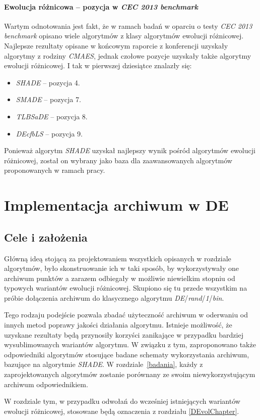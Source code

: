 \documentclass[12pt,a4paper]{report}
\begin{document}
{{{{{{\subsubsection{Ewolucja różnicowa -- pozycja w \emph{CEC 2013 benchmark}}
\par{
Wartym odnotowania jest fakt, że w ramach badań w oparciu o testy \emph{CEC 2013 benchmark} opisano wiele algorytmów z klasy algorytmów ewolucji różnicowej. Najlepsze rezultaty opisane w końcowym raporcie z konferencji \cite{CEC2013Comp} uzyskały algorytmy z rodziny \emph{CMAES}, jednak czołowe pozycje uzyskały także algorytmy ewolucji różnicowej. I tak w pierwszej dziesiątce znalazły się:
\begin{itemize}
\item \emph{SHADE} \cite{SHADE} -- pozycja 4.
\item \emph{SMADE} \cite{SMADE} -- pozycja 7.
\item \emph{TLBSaDE} \cite{TLBSaDE} -- pozycja 8.
\item \emph{DEcfbLS} \cite{DEcfbLS} -- pozycja 9.
\end{itemize}
}
\par{
Ponieważ algorytm \emph{SHADE} uzyskał najlepszy wynik pośród algorytmów ewolucji różnicowej, został on wybrany jako baza dla zaawansowanych algorytmów proponowanych w ramach pracy.
}

\chapter{Implementacja archiwum w DE}
\section{Cele i założenia}
\par{
Główną ideą stojącą za projektowaniem wszystkich opisanych w rozdziale algorytmów, było skonstruowanie ich w taki sposób, by wykorzystywały one archiwum punktów a zarazem odbiegały w możliwie niewielkim stopniu od typowych wariantów ewolucji różnicowej. Skupiono się tu przede wszystkim na próbie dołączenia archiwum do klasycznego algorytmu \emph{DE}/\emph{rand}/\emph{1}/\emph{bin}.
}
\par{
Tego rodzaju podejście pozwala zbadać użyteczność archiwum w oderwaniu od innych metod poprawy jakości działania algorytmu. Istnieje możliwość, że uzyskane rezultaty będą przynosiły korzyści zanikające w przypadku bardziej wysublimowanych wariantów algorytmu. W związku z tym, zaproponowano także odpowiedniki algorytmów stosujące badane schematy wykorzystania archiwum, bazujące na algorytmie \emph{SHADE}. W rozdziale~\ref{badania}, każdy z zaprojektowanych algorytmów zostanie porównany ze swoim niewykorzystującym archiwum odpowiednikiem.
}
\par{
W rozdziale tym, w przypadku odwołań do wcześniej istniejących wariantów ewolucji różnicowej, stosowane będą oznaczenia z rozdziału \ref{DEvolChapter}.
}
}}}}}}
\end{document}
